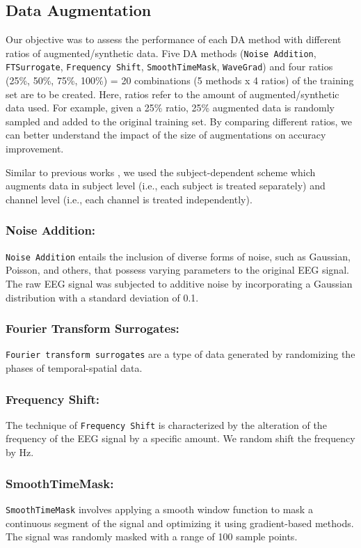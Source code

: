 \subsection{Data Augmentation}
Our objective was to assess the performance of each DA method with different ratios of augmented/synthetic data.
Five DA methods (\texttt{Noise Addition}, \texttt{FTSurrogate}, \texttt{Frequency Shift}, \texttt{SmoothTimeMask}, \texttt{WaveGrad}) and four ratios (25\%, 50\%, 75\%, 100\%) = 20 combinations (5 methods x 4 ratios) of the training set are to be created.
Here, ratios refer to the amount of augmented/synthetic data used.
For example, given a 25\% ratio, 25\% augmented data is randomly sampled and added to the original training set.
By comparing different ratios, we can better understand the impact of the size of augmentations on accuracy improvement.

Similar to previous works \cite{rommel2021cadda,mohsenvand2020contrastive,leeb2008bci,terzano2001atlas}, we used the subject-dependent scheme which augments data in subject level (i.e., each subject is treated separately) and channel level (i.e., each channel is treated independently).


\subsubsection{Noise Addition:}
\texttt{Noise Addition} entails the inclusion of diverse forms of noise, such as Gaussian, Poisson, and others, that possess varying parameters to the original EEG signal. 
The raw EEG signal was subjected to additive noise by incorporating a Gaussian distribution with a standard deviation of 0.1. 

\subsubsection{Fourier Transform Surrogates:}
\texttt{Fourier transform surrogates} are a type of data generated by randomizing the phases of temporal-spatial data.


\subsubsection{Frequency Shift:} The technique of \texttt{Frequency Shift} is characterized by the alteration of the frequency of the EEG signal by a specific amount.
We random shift the frequency by  Hz.

\subsubsection{SmoothTimeMask:}
\texttt{SmoothTimeMask} involves applying a smooth window function to mask a continuous segment of the signal and optimizing it using gradient-based methods.
The signal was randomly masked with a range of 100 sample points.

